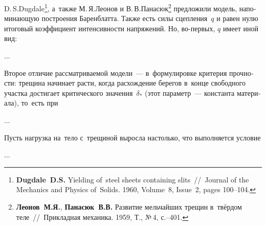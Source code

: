 

\begin{otherlanguage}{russian}

D.\,S.\;Dugdale\footnote{\textbf{Dugdale~D.\:S.} Yielding of~steel sheets containing slits~//~Journal of the Mechanics and Physics of~Solids. 1960, Volume~8, Issue~2, pages 100\hbox{--}104.
}\hspace{-0.4ex}, а~также М.\,Я.\;Леонов и В.\,В.\;Панасюк\footnote{\textbf{Леонов~М.\:Я.}, \textbf{Панасюк~В.\:В.} Развитие мельчайших трещин в~твёрдом теле~//~Прикладная механика. 1959, Т., №\,4, с.\hbox{--}401.} предложили модель, напоминающую построения Баренблатта. Также есть силы сцепления~$q$ и равен нулю итоговый коэффициент интенсивности напряжений. Но, во\hbox{-}первых, $q$ имеет иной вид:

...

Второе отличие рассматриваемой модели~--- в~формулировке критерия прочности: трещина начинает расти, когда расхождение берегов в~конце свободного участка достигает критического значения~$\delta_{*}$ (этот параметр~--- константа материала), то~есть при

...



\end{otherlanguage}



\begin{otherlanguage}{russian}

Пусть нагрузка на~тело с~трещиной выросла настолько, что выполняется условие

...



\end{otherlanguage}

